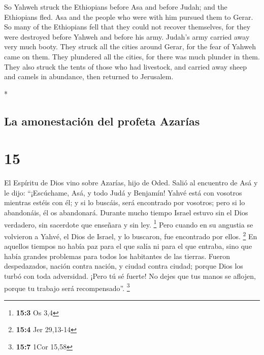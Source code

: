 \begin{paracol}{2}
\begin{otherlanguage}{english}
 So Yahweh struck the Ethiopians before Asa and before
Judah; and the Ethiopians fled.  Asa and the people who
were with him pursued them to Gerar. So many of the Ethiopians fell that
they could not recover themselves, for they were destroyed before Yahweh
and before his army. Judah's army carried away very much booty.
 They struck all the cities around Gerar, for the fear of
Yahweh came on them. They plundered all the cities, for there was much
plunder in them.  They also struck the tents of those who
had livestock, and carried away sheep and camels in abundance, then
returned to Jerusalem.

\end{otherlanguage}

\switchcolumn[0]*

\hypertarget{la-amonestaciuxf3n-del-profeta-azaruxedas}{%
\subsection{La amonestación del profeta
Azarías}\label{la-amonestaciuxf3n-del-profeta-azaruxedas}}

\hypertarget{section-28}{%
\section{15}\label{section-28}}

 El Espíritu de Dios vino sobre Azarías, hijo de Oded.
 Salió al encuentro de Asá y le dijo: ``¡Escúchame, Asá, y
todo Judá y Benjamín! Yahvé está con vosotros mientras estéis con él; y
si lo buscáis, será encontrado por vosotros; pero si lo abandonáis, él
os abandonará.  Durante mucho tiempo Israel estuvo sin el
Dios verdadero, sin sacerdote que enseñara y sin ley. \footnote{\textbf{15:3}
  Os 3,4}  Pero cuando en su angustia se volvieron a
Yahvé, el Dios de Israel, y lo buscaron, fue encontrado por ellos.
\footnote{\textbf{15:4} Jer 29,13-14}  En aquellos tiempos
no había paz para el que salía ni para el que entraba, sino que había
grandes problemas para todos los habitantes de las tierras.
 Fueron despedazados, nación contra nación, y ciudad
contra ciudad; porque Dios los turbó con toda adversidad. 
¡Pero tú sé fuerte! No dejes que tus manos se aflojen, porque tu trabajo
será recompensado''. \footnote{\textbf{15:7} 1Cor 15,58}

\hypertarget{renovaciuxf3n-de-asa-del-pacto-con-dios}{%
}
\end{paracol}
